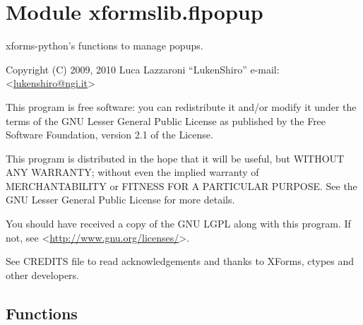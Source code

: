 %
%
%


\section{Module xformslib.flpopup}

    \label{xformslib:flpopup}

xforms-python's functions to manage popups.

Copyright (C) 2009, 2010  Luca Lazzaroni ``LukenShiro''
e-mail: <\href{mailto:lukenshiro@ngi.it}{lukenshiro@ngi.it}>

This program is free software: you can redistribute it and/or modify
it under the terms of the GNU Lesser General Public License as
published by the Free Software Foundation, version 2.1 of the License.

This program is distributed in the hope that it will be useful,
but WITHOUT ANY WARRANTY; without even the implied warranty of
MERCHANTABILITY or FITNESS FOR A PARTICULAR PURPOSE. See the
GNU Lesser General Public License for more details.

You should have received a copy of the GNU LGPL along with this
program. If not, see <\href{http://www.gnu.org/licenses/}{http://www.gnu.org/licenses/}>.

See CREDITS file to read acknowledgements and thanks to XForms,
ctypes and other developers.


  \subsection{Functions}

    \label{xformslib:flpopup:fl_popup_add}

